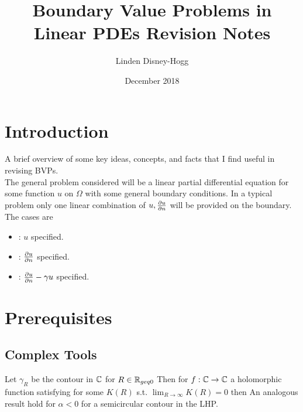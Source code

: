 \documentclass{article}
\title{Boundary Value Problems in Linear PDEs Revision Notes}
\author{Linden Disney-Hogg}
\date{December 2018}
\begin{document}
\maketitle
\tableofcontents

\section{Introduction}
A brief overview of some key ideas, concepts, and facts that I find useful in revising BVPs. \\
The general problem considered will be a linear partial differential equation for some function $u$ on $\Omega$ with some general boundary conditions. In a typical problem only one linear combination of $u, \pd[u]{n}$ will be provided on the boundary. The cases are 
\begin{itemize}
    \item {} : $u$ specified. 
    \item {} : $\pd[u]{n}$ specified.
    \item {} : $\pd[u]{n} - \gamma u$ specified. 
\end{itemize}

\section{Prerequisites}
\subsection{Complex Tools}

\begin{lemma}\label{lemma:BVP:JordansLemma}
Let $\gamma_R$ be the contour in $\mbb{C}$ for $R\in\mbb{R}_{geq 0}$
Then for $f:\mbb{C}\to\mbb{C}$ a holomorphic function satisfying 
for some $K(R)$ s.t. $\lim_{R\to\infty} K(R) = 0$ then 
An analogous result hold for $\alpha <0$ for a semicircular contour in the LHP. 
\end{lemma}
\end{document}
